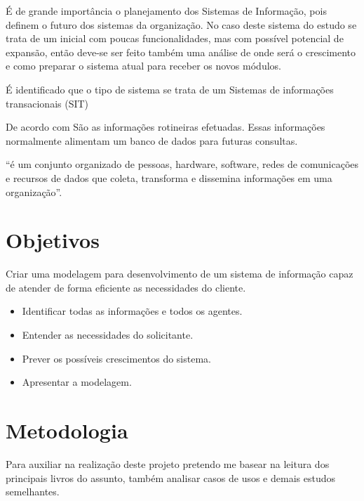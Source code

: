 \documentclass[
	12pt,				%
 	oneside,			%
 	openany,
	a4paper,			%
	english,			%
	french,				%
	spanish,			%
	brazil				%
	]{abntex2}
\begin{document}
É de grande importância o planejamento dos Sistemas de Informação, pois definem o futuro dos sistemas da organização. No caso deste sistema do estudo se trata de um inicial com poucas funcionalidades, mas com possível potencial de expansão, então deve-se ser feito também uma análise de onde será o crescimento e como preparar o sistema atual para receber os novos módulos.


É identificado que o tipo de sistema se trata de um Sistemas de informações transacionais (SIT)

De acordo com \cite{obrien2004} São as informações rotineiras efetuadas. Essas informações normalmente alimentam um banco de dados para futuras consultas. 

\cite[p.~6]{obrien2004} “é um conjunto organizado de pessoas, hardware, software, redes de comunicações e recursos de dados que coleta, transforma e dissemina informações em uma organização”.

\chapter{Objetivos}

Criar uma modelagem para desenvolvimento de um sistema de informação capaz de
atender de forma eficiente as necessidades do cliente.

\begin{itemize}
	\item Identificar todas as informações e todos os agentes.
	
	\item Entender as necessidades do solicitante.
	
	\item Prever os possíveis crescimentos do sistema.
	
	\item Apresentar a modelagem.
\end{itemize}

\chapter{Metodologia}

Para auxiliar na realização deste projeto pretendo me basear na leitura dos principais livros do assunto, também analisar casos de usos e demais estudos semelhantes.

\postextual

\end{document}
